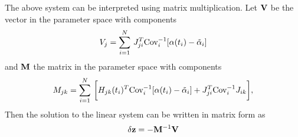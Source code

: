 The above system can be interpreted using matrix multiplication. Let $\bf V$ be the vector in the parameter space with components
$$V_j = \sum_{i=1}^N\, J_{ji}^T \hbox{Cov}_i^{-1}[\alpha(t_i) - \tilde\alpha_i] $$ and $\bf M$ the matrix in the parameter space with components
$$M_{jk} = \sum_{i=1}^N\, \bigg[H_{jk}(t_i)^T \hbox{Cov}_i^{-1}[\alpha(t_i) - \tilde\alpha_i]  + J_{ji}^T \hbox{Cov}_i^{-1}J_{ik} \bigg],$$
Then the solution to the linear system can be written in matrix form as
$${\bf \delta z} = - {\bf M}^{-1}{\bf V}$$



